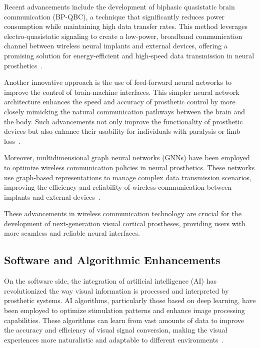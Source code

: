 \documentclass[twocolumn,10pt]{article}
\begin{document}
Recent advancements include the development of biphasic quasistatic brain
communication (BP-QBC), a technique that significantly reduces power consumption
while maintaining high data transfer rates. This method leverages
electro-quasistatic signaling to create a low-power, broadband communication
channel between wireless neural implants and external devices, offering a
promising solution for energy-efficient and high-speed data transmission in
neural prosthetics~\parencite{chatterjeeBiphasicQuasistaticBrain2023}.

Another innovative approach is the use of feed-forward neural networks to
improve the control of brain-machine interfaces. This simpler neural network
architecture enhances the speed and accuracy of prosthetic control by more
closely mimicking the natural communication pathways between the brain and the
body. Such advancements not only improve the functionality of prosthetic devices
but also enhance their usability for individuals with paralysis or limb
loss~\parencite{willseyRealtimeBrainmachineInterface2022}.

Moreover, multidimensional graph neural networks (GNNs) have been employed to
optimize wireless communication policies in neural prosthetics. These networks
use graph-based representations to manage complex data transmission scenarios,
improving the efficiency and reliability of wireless communication between
implants and external devices~\parencite{liuMultidimensionalGraphNeural2024}.

These advancements in wireless communication technology are crucial for the
development of next-generation visual cortical prostheses, providing users with
more seamless and reliable neural interfaces.

\subsection*{Software and Algorithmic Enhancements}
On the software side, the integration of artificial intelligence (AI) has
revolutionized the way visual information is processed and interpreted by
prosthetic systems. AI algorithms, particularly those based on deep learning,
have been employed to optimize stimulation patterns and enhance image processing
capabilities. These algorithms can learn from vast amounts of data to improve
the accuracy and efficiency of visual signal conversion, making the visual
experiences more naturalistic and adaptable to different
environments~\parencite{romeniMachineLearningFramework2021}.
\end{document}
